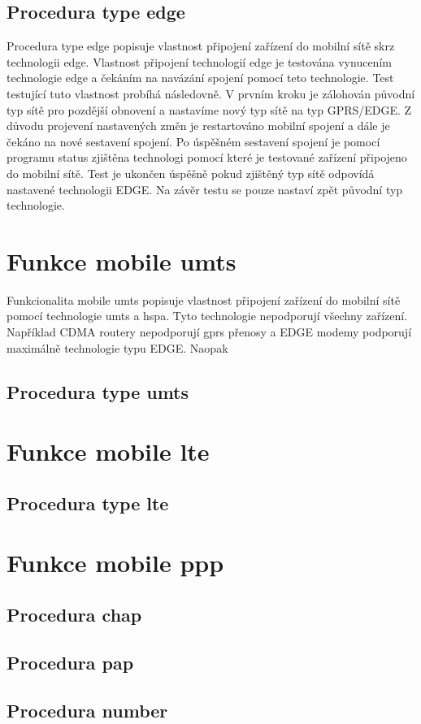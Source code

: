 \subsection{Procedura type edge}
Procedura type edge popisuje vlastnost připojení zařízení do mobilní sítě skrz technologii edge. Vlastnost připojení technologií edge je testována vynucením technologie edge a čekáním na navázání spojení pomocí teto technologie. Test testující tuto vlastnost probíhá následovně. V prvním kroku je zálohován původní typ sítě pro pozdější obnovení a nastavíme nový typ sítě na typ GPRS/EDGE. Z důvodu projevení nastavených změn je restartováno mobilní spojení a dále je čekáno na nové sestavení spojení. Po úspěšném sestavení spojení je pomocí programu status zjištěna technologi pomocí které je testované zařízení připojeno do mobilní sítě. Test je ukončen úspěšně pokud zjištěný typ sítě odpovídá nastavené technologii EDGE. Na závěr testu se pouze nastaví zpět původní typ technologie.

\section{Funkce mobile umts}
Funkcionalita mobile umts popisuje vlastnost připojení zařízení do mobilní sítě pomocí technologie umts a hspa. Tyto technologie nepodporují všechny zařízení. Například CDMA routery nepodporují gprs přenosy  a EDGE modemy podporují maximálně technologie typu EDGE. Naopak 

\subsection{Procedura type umts}

\section{Funkce mobile lte}
\subsection{Procedura type lte}

\section{Funkce mobile ppp}
\subsection{Procedura chap}
\subsection{Procedura pap}
\subsection{Procedura number}




\endinput
